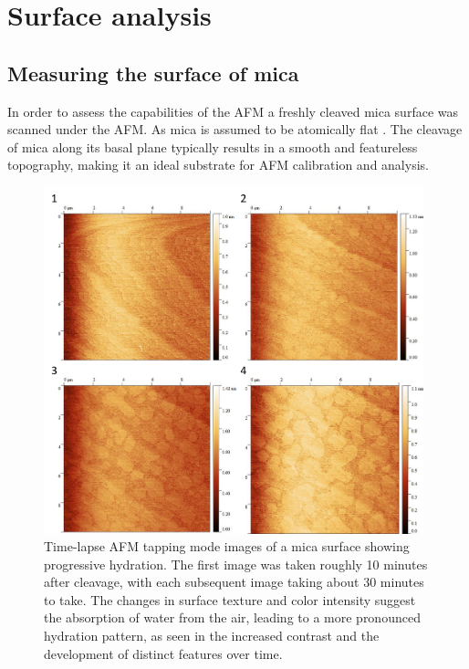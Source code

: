 \section{Surface analysis}

\subsection{Measuring the surface of mica}

In order to assess the capabilities of the AFM a freshly cleaved mica surface was scanned under the AFM. As mica is assumed to be atomically flat \cite{MicaSurf, Ostendorf_2008}. The cleavage of mica along its basal plane typically results in a smooth and featureless topography, making it an ideal substrate for AFM calibration and analysis.

\begin{figure}[h!!!!!!!]     %
        \begin{center}
          \includegraphics[width=110mm]{chapter3/Mica hydration.png}
\end{center}
\caption{Time-lapse AFM tapping mode images of a mica surface showing progressive hydration. The first image was taken roughly 10 minutes after cleavage, with each subsequent image taking about 30 minutes to take. The changes in surface texture and color intensity suggest the absorption of water from the air, leading to a more pronounced hydration pattern, as seen in the increased contrast and the development of distinct features over time.}
\label{fig:ImageAFM}                 %
\end{figure}

